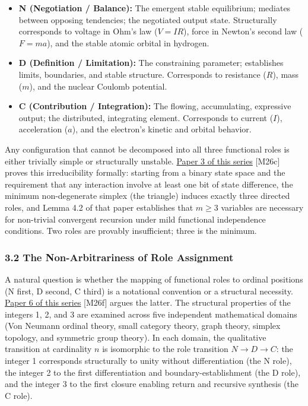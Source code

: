 \documentclass[
  11pt,
  letterpaper,
]{article}
\providecommand{\tightlist}{%
  \setlength{\itemsep}{0pt}\setlength{\parskip}{0pt}}
\begin{document}
\begin{itemize}
\tightlist
\item
  \textbf{N (Negotiation / Balance):} The emergent stable equilibrium;
  mediates between opposing tendencies; the negotiated output state.
  Structurally corresponds to voltage in Ohm's law (\(V = IR\)), force
  in Newton's second law (\(F = ma\)), and the stable atomic orbital in
  hydrogen.
\item
  \textbf{D (Definition / Limitation):} The constraining parameter;
  establishes limits, boundaries, and stable structure. Corresponds to
  resistance (\(R\)), mass (\(m\)), and the nuclear Coulomb potential.
\item
  \textbf{C (Contribution / Integration):} The flowing, accumulating,
  expressive output; the distributed, integrating element. Corresponds
  to current (\(I\)), acceleration (\(a\)), and the electron's kinetic
  and orbital behavior.
\end{itemize}

Any configuration that cannot be decomposed into all three functional
roles is either trivially simple or structurally unstable.
\href{https://github.com/baardev/truevalue/blob/main/docnav/Research/papers/3_minimal-recursive-triadic-framework/3_minimal-recursive-triadic-framework.pdf}{Paper
3 of this series} {[}M26c{]} proves this irreducibility formally:
starting from a binary state space and the requirement that any
interaction involve at least one bit of state difference, the minimum
non-degenerate simplex (the triangle) induces exactly three directed
roles, and Lemma 4.2 of that paper establishes that \(m \ge 3\)
variables are necessary for non-trivial convergent recursion under mild
functional independence conditions. Two roles are provably insufficient;
three is the minimum.

\subsubsection{3.2 The Non-Arbitrariness of Role
Assignment}\label{the-non-arbitrariness-of-role-assignment}

A natural question is whether the mapping of functional roles to ordinal
positions (N first, D second, C third) is a notational convention or a
structural necessity.
\href{https://github.com/baardev/truevalue/blob/main/docnav/Research/papers/6_qualitative-nature-integers-triadic-roles/6_qualitative-nature-integers-triadic-roles.pdf}{Paper
6 of this series} {[}M26f{]} argues the latter. The structural
properties of the integers 1, 2, and 3 are examined across five
independent mathematical domains (Von Neumann ordinal theory, small
category theory, graph theory, simplex topology, and symmetric group
theory). In each domain, the qualitative transition at cardinality \(n\)
is isomorphic to the role transition \(N \to D \to C\): the integer 1
corresponds structurally to unity without differentiation (the N role),
the integer 2 to the first differentiation and boundary-establishment
(the D role), and the integer 3 to the first closure enabling return and
recursive synthesis (the C role).
\end{document}
